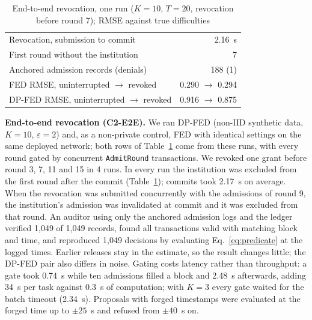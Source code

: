 \documentclass[pdflatex,iicol,sn-mathphys-num]{sn-jnl}
\theoremstyle{thmstyleone}
\newcommand{\EtoeAuditDecisions}{1,049}
\newcommand{\EtoeAuditProofs}{1,049}
\newcommand{\EtoeAuditRecords}{1,049}
\newcommand{\EtoeCommitMean}{2.17}
\newcommand{\EtoeExampleCommit}{2.16}
\newcommand{\EtoeExampleDenied}{1}
\newcommand{\EtoeExampleDpAfter}{0.875}
\newcommand{\EtoeExampleDpBefore}{0.916}
\newcommand{\EtoeExampleExcluded}{7}
\newcommand{\EtoeExampleFedAfter}{0.294}
\newcommand{\EtoeExampleFedBefore}{0.290}
\newcommand{\EtoeExampleRecords}{188}
\newcommand{\EtoeExampleRound}{7}
\newcommand{\EtoeGateAfter}{2.48}
\newcommand{\EtoeGateBefore}{0.74}
\newcommand{\EtoeGateTotal}{34}
\newcommand{\EtoeOffline}{0.3}
\newcommand{\EtoeRaceReason}{was invalidated at commit}
\newcommand{\EtoeRaceRound}{9}
\newcommand{\EtoeRevokeRounds}{3, 7, 11 and 15}
\newcommand{\EtoeRounds}{20}
\newcommand{\EtoeRuns}{4}
\newcommand{\EtoeThreeGate}{2.34}
\newcommand{\TsAcceptedMax}{25}
\newcommand{\TsRejectedMin}{40}
\begin{document}
\begin{table}[t]
\centering
\caption{End-to-end revocation, one run ($K=10$, $T=\EtoeRounds$, revocation before round \EtoeExampleRound{}); RMSE against true difficulties}
\label{tab:etoe}
\footnotesize
\begin{tabular}{@{}p{}r@{}}
\toprule
Revocation, submission to commit & \EtoeExampleCommit{}~s \\
First round without the institution & \EtoeExampleExcluded{} \\
Anchored admission records (denials) & \EtoeExampleRecords{} (\EtoeExampleDenied{}) \\
FED RMSE, uninterrupted $\to$ revoked & \EtoeExampleFedBefore{} $\to$ \EtoeExampleFedAfter{} \\
DP-FED RMSE, uninterrupted $\to$ revoked & \EtoeExampleDpBefore{} $\to$ \EtoeExampleDpAfter{} \\
\bottomrule
\end{tabular}
\end{table}

\textbf{End-to-end revocation (C2-E2E).} We ran DP-FED (non-IID synthetic data, $K=10$, $\varepsilon=2$) and, as a non-private control, FED with identical settings on the same deployed network; both rows of Table~\ref{tab:etoe} come from these runs, with every round gated by concurrent \texttt{AdmitRound} transactions. We revoked one grant before round \EtoeRevokeRounds{} in \EtoeRuns{} runs. In every run the institution was excluded from the first round after the commit (Table~\ref{tab:etoe}); commits took \EtoeCommitMean{}~s on average. When the revocation was submitted concurrently with the admissions of round \EtoeRaceRound{}, the institution's admission \EtoeRaceReason{} and it was excluded from that round. An auditor using only the anchored admission logs and the ledger verified \EtoeAuditProofs{} of \EtoeAuditRecords{} records, found all transactions valid with matching block and time, and reproduced \EtoeAuditDecisions{} decisions by evaluating Eq.~\eqref{eq:predicate} at the logged times. Earlier releases stay in the estimate, so the result changes little; the DP-FED pair also differs in noise. Gating costs latency rather than throughput: a gate took \EtoeGateBefore{}~s while ten admissions filled a block and \EtoeGateAfter{}~s afterwards, adding \EtoeGateTotal{}~s per task against \EtoeOffline{}~s of computation; with $K=3$ every gate waited for the batch timeout (\EtoeThreeGate{}~s). Proposals with forged timestamps were evaluated at the forged time up to $\pm\TsAcceptedMax$~s and refused from $\pm\TsRejectedMin$~s on.
\end{document}
